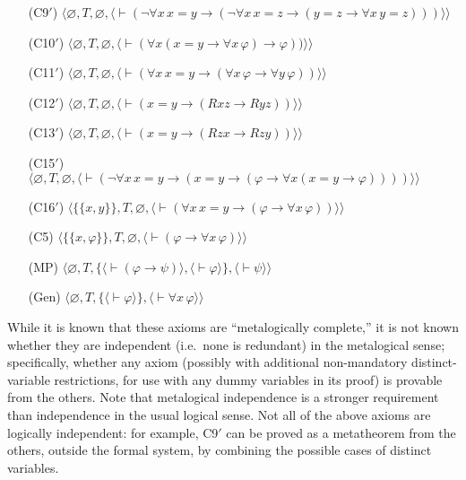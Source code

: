 \begin{itemize}
\begin{itemize}
      \item[(C9$'$)] $\langle\varnothing,T,
               \varnothing,
               \langle \vdash(\lnot\forall x\, x=y\to(\lnot\forall x\, x=z\to
                 (y=z\to\forall x\, y=z)))\rangle\rangle$
      \item[(C10$'$)] $\langle\varnothing,T,
               \varnothing,
               \langle \vdash(\forall x(x=y\to\forall x\,\varphi)\to
                 \varphi))\rangle\rangle$
      \item[(C11$'$)] $\langle\varnothing,T,
               \varnothing,
               \langle \vdash(\forall x\, x=y\to(\forall x\,\varphi
               \to\forall y\,\varphi))\rangle\rangle$
      \item[(C12$'$)] $\langle\varnothing,T,
               \varnothing,
               \langle \vdash(x=y\to(Rxz\to Ryz))\rangle\rangle$
      \item[(C13$'$)] $\langle\varnothing,T,
               \varnothing,
               \langle \vdash(x=y\to(Rzx\to Rzy))\rangle\rangle$
      \item[(C15$'$)] $\langle\varnothing,T,
               \varnothing,
               \langle \vdash(\lnot\forall x\, x=y\to(x=y\to(\varphi
                 \to\forall x(x=y\to\varphi))))\rangle\rangle$
      \item[(C16$'$)] $\langle\{\{x,y\}\},T,
               \varnothing,
               \langle \vdash(\forall x\, x=y\to(\varphi\to\forall x\,\varphi)
                 )\rangle\rangle$
      \item[(C5)] $\langle\{\{x,\varphi\}\},T,\varnothing,
               \langle \vdash(\varphi\to\forall x\,\varphi)
               \rangle\rangle$
      \item[(MP)] $\langle\varnothing,T,
               \{\langle\vdash(\varphi\to\psi)\rangle,
                 \langle\vdash\varphi\rangle\},
               \langle\vdash\psi\rangle\rangle$
      \item[(Gen)] $\langle\varnothing,T,
               \{\langle\vdash\varphi\rangle\},
               \langle\vdash\forall x\,\varphi\rangle\rangle$
    \end{itemize}
\end{itemize}

While it is known that these axioms are ``metalogically complete,'' it is
not known whether they are independent (i.e.\ none is
redundant) in the metalogical sense; specifically, whether any axiom (possibly
with additional non-mandatory distinct-variable restrictions, for use with any
dummy variables in its proof) is provable from the others.  Note that
metalogical independence is a stronger requirement than independence in the
usual logical sense.  Not all of the above axioms are logically independent:
for example, C9$'$ can be proved as a metatheorem from the others, outside the
formal system, by combining the possible cases of distinct variables.

